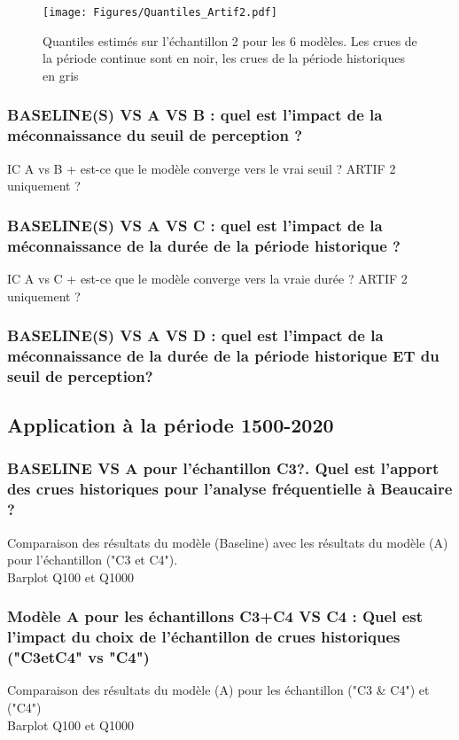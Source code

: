 \documentclass[11pt]{article}
\begin{document}
	\begin{figure}[h]
        \centering
        \texttt{[image: Figures/Quantiles\_Artif2.pdf]}
        \caption{Quantiles estimés sur l'échantillon 2 pour les 6 modèles. Les crues de la période continue sont en noir, les crues de la période historiques en gris}
        \label{fig:Quants_Artif2}
\end{figure}
		
\FloatBarrier


		\subsubsection{BASELINE(S) VS A VS B : quel est l'impact de la méconnaissance du seuil de perception ?}
	
		IC A vs B + est-ce que le modèle converge vers le vrai seuil ? 
		ARTIF 2 uniquement ? 
		
		\subsubsection{BASELINE(S) VS A VS C : quel est l'impact de la méconnaissance de la durée de la période historique ?}
	
		IC A vs C + est-ce que le modèle converge vers la vraie durée ? 
		ARTIF 2 uniquement ? 
		
		\subsubsection{BASELINE(S) VS A VS D : quel est l'impact de la méconnaissance de la durée de la période historique ET du seuil de perception?}
	
	\subsection{Application à la période 1500-2020}

	
		\subsubsection{BASELINE VS A pour l'échantillon C3?. Quel est l'apport des crues historiques pour l'analyse fréquentielle à Beaucaire ?}
	Comparaison des résultats du modèle (Baseline) avec les résultats du modèle (A) pour l'échantillon ("C3 et C4").\\
	Barplot Q100 et Q1000
	
		\subsubsection{Modèle A pour les échantillons C3+C4 VS C4 : Quel est l'impact du choix de l'échantillon de crues historiques ("C3etC4" vs "C4")}
	Comparaison des résultats du modèle (A) pour les échantillon ("C3 \& C4") et ("C4")\\
	Barplot Q100 et Q1000	
	
\end{document}
